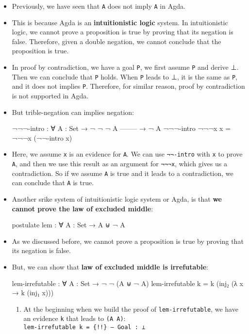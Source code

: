 \documentclass{lecturenotes}
\newcommand{\agdaempty}{\textsf{⊥}\xspace}
\begin{document}
\begin{itemize}
\item Previously, we have seen that \texttt{\lnot \lnot A} does not imply \texttt{A} in Agda.
\item This is because Agda is an \textbf{intuitionistic logic} system. 
      In intuitionistic logic, we cannot prove a proposition is true by proving that its negation is false.
      Therefore, given a double negation, we cannot conclude that the proposition is true.
\item In proof by contradiction, we have a goal \texttt{P}, we first assume \texttt{\lnot P} and derive \agdaempty.
      Then we can conclude that \texttt{P} holds. When \texttt{\lnot P} leads to \agdaempty, it is the same as 
      \texttt{\lnot \lnot P}, and it does not implies \texttt{P}. Therefore, for similar reason, proof by contradiction is not supported in Agda.

\item But trible-negation can implies negation:
\begin{code}
¬¬¬-intro : ∀ {A : Set}
    → ¬ ¬ ¬ A
    --------
    → ¬ A
¬¬¬-intro ¬¬¬x x = ¬¬¬x (¬¬-intro x)
\end{code}
\item Here, we assume \texttt{x} is an evidence for \texttt{A}. We can use \texttt{¬¬-intro} with \texttt{x} to prove \texttt{\lnot \lnot A},
      and then we use this result as an argument for \texttt{¬¬¬x}, which gives us a contradiction.
      So if we assume \texttt{A} is true and it leads to a contradiction, we can conclude that \texttt{\lnot A} is true.

\item Another srike system of intuitionistic logic system or Agda, is that
      \textbf{we cannot prove the law of excluded middle}:
\begin{code}
postulate
  lem : ∀ {A : Set} →  A ⊎ ¬ A
\end{code}
\item As we discussed before, we cannot prove a proposition is true by proving that its negation is false.

\item But, we can show that \textbf{law of excluded middle is irrefutable}:
\begin{code}
lem-irrefutable : ∀ {A : Set} → ¬ ¬ (A ⊎ ¬ A)
lem-irrefutable k = k (inj₂ (λ x → k (inj₁ x)))
\end{code}

\begin{enumerate}
\item At the beginning when we build the proof of \texttt{lem-irrefutable},
      we have an evidence \texttt{k} that leads to \texttt{\lnot (A \uplus \lnot A)}:
      \\ \texttt{lem-irrefutable k = \{!!\} -- Goal : \agdaempty}


\end{enumerate}
\end{itemize}
\end{document}
